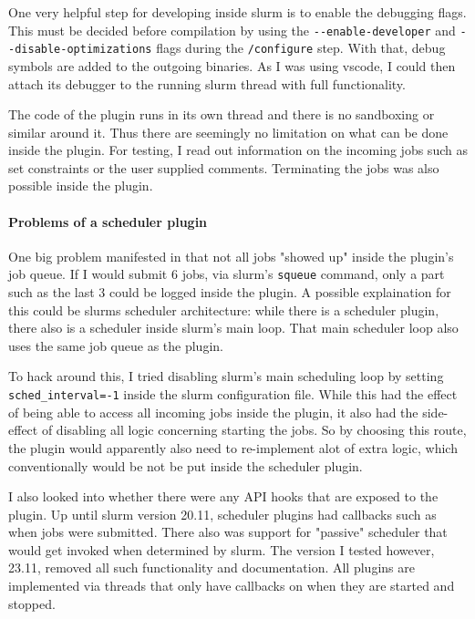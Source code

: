 One very helpful step for developing inside slurm is to enable the debugging flags.
This must be decided before compilation by using the \verb|--enable-developer| and \verb|--disable-optimizations| flags during the \verb|/configure| step. 
With that, debug symbols are added to the outgoing binaries. 
As I was using vscode, I could then attach its debugger to the running slurm thread with full functionality.

The code of the plugin runs in its own thread and there is no sandboxing or similar around it.
Thus there are seemingly no limitation on what can be done inside the plugin. 
For testing, I read out information on the incoming jobs such as set constraints or the user supplied comments. Terminating the jobs was also possible inside the plugin.

\paragraph{Problems of a scheduler plugin}

One big problem manifested in that not all jobs "showed up" inside the plugin's job queue. 
If I would submit 6 jobs, via slurm's \verb|squeue| command, only a part such as the last 3 could be logged inside the plugin.
A possible explaination for this could be slurms scheduler architecture: while there is a scheduler plugin, there also is a scheduler inside slurm's main loop. 
That main scheduler loop also uses the same job queue as the plugin.

To hack around this, I tried disabling slurm's main scheduling loop by setting \verb|sched_interval=-1| inside the slurm configuration file. 
While this had the effect of being able to access all incoming jobs inside the plugin, it also had the side-effect of disabling all logic concerning starting the jobs.
So by choosing this route, the plugin would apparently also need to re-implement alot of extra logic, which conventionally would be not be put inside the scheduler plugin. 

I also looked into whether there were any API hooks that are exposed to the plugin. 
Up until slurm version 20.11, scheduler plugins had callbacks such as when jobs were submitted. There also was support for "passive" scheduler that would get invoked when determined by slurm.
The version I tested however,  23.11, removed all such functionality and documentation. All plugins are implemented via threads that only have callbacks on when they are started and stopped.

